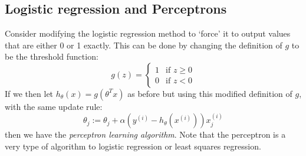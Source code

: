 \documentclass{report}
\begin{document}
\subsection{Logistic regression and Perceptrons}
Consider modifying the logistic regression method to `force' it to output values that are
either 0 or 1 exactly. This can be done by changing the definition of $g$ to be the threshold function:
\begin{equation*}
g(z)=\begin{cases}
1&\text{if }z\geq0\\
0&\text{if }z<0
\end{cases}
\end{equation*}
If we then let $h_\theta(x)=g(\theta^Tx)$ as before but using this modified definition of $g$, with the
same update rule:
\begin{equation*}
\theta_j:=\theta_j+\alpha(y^{(i)}-h_\theta(x^{(i)}))x^{(i)}_j
\end{equation*}
then we have the \textit{perceptron learning algorithm}.
Note that the perceptron is a very type of algorithm to logistic regression or least squares regression. 
\newpage
\end{document}
